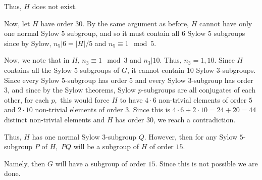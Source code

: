 \documentclass[12pt]{Qual}
\begin{document}
\begin{solution}
\begin{enumerate}[label=(\alph*)]
    Thus, $H$ does not exist.

     Now, let $H$ have order $30.$ By the same argument as before, $H$ cannot have only one normal Sylow $5$ subgroup, and so it must contain all $6$ Sylow $5$ subgroups since by Sylow, $n_5|6=|H|/5$ and $n_5\equiv 1\mod 5.$

    Now, we note that in $H$, $n_3\equiv 1\mod 3$ and $n_3|10$. Thus, $n_3=1,10.$ Since $H$ contains all the Sylow $5$ subgroups of $G$, it cannot contain $10$ Sylow $3$-subgroups. Since every Sylow $5$-subgroup has order $5$ and every Sylow $3$-subgroup has order $3$, and since by the Sylow theorems, Sylow $p$-subgroups are all conjugates of each other, for each $p,$ this would force $H$ to have $4\cdot 6$ non-trivial elements of order $5$ and $2\cdot 10$ non-trivial elements of order $3$. Since this is $4\cdot 6+2\cdot 10=24+20=44$ distinct non-trivial elements and $H$ has order $30$, we reach a contradiction.

    Thus, $H$ has one normal Sylow $3$-subgroup $Q$. However, then for any Sylow $5$-subgroup $P$ of $H,$ $PQ$ will be a subgroup of $H$ of order $15$.

    Namely, then $G$ will have a subgroup of order $15.$ Since this is not possible we are done.

\begin{comment}
    Therefore, $$|H\cap N_G(P)|=|N_H(P)|=|H|/n_5=30/6=5$$ and so $$|HN_G(P)|=\frac{|H||N_G(P)|}{|H\cap N_G(P)|}=\frac{30\cdot 20}{5}=120.$$

    Namely, $G=HN_G(P)=N_G(P)H$



    However, because $3$ does not divide $N_G(P)$ this implies that $G$ has one normal Sylow $3$-subgroup.

    To see this, we examine $N_G(Q)$ where $Q$ is a Sylow $3$-subgroup of $H$ (and so of $G$). $H\subset N_G(Q)$. If $N_G(Q)=H$ then $N_G(Q)\cap N_G(P)=H\cap N_G(P)=P$ so $P$ normalizes $Q.$

    However, then $PQ=QP$ since for all $p\in P$ and $q\in Q$, we have that $pqp^{-1}=q_0$ some $q_0\in Q$ so $pq=q_0p\in QP$ and similarly for the other inclusion.

    Therefore, $PQ$ is a subgroup and it has order $3\cdot 5=15$. However, we already showed no such subgroups existed.

    If $N_G(Q)$ is strictly greater than $H$, then it has order $60$ or order $120$. If it has order $60$, then it is normal in $G$ because it has index $2.$ However, by Sylow, $$G=N_G(N_G(Q))=N_G(Q)\qquad Q\text{ Sylow subgroups }$$ so this contradicts that $N_G(Q)$ has order $60.$


\end{comment}
\end{enumerate}
\end{solution}
\end{document}
